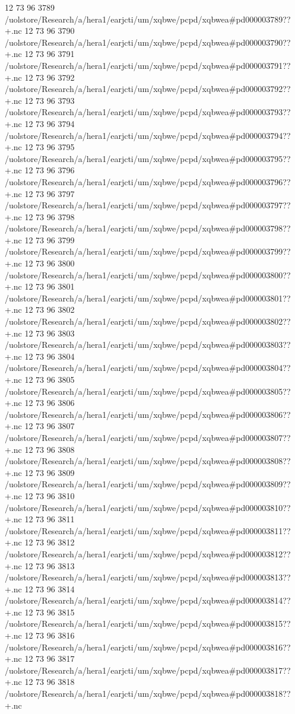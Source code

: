 12 73 96
3789
/uolstore/Research/a/hera1/earjcti/um/xqbwe/pcpd/xqbwea#pd000003789??+.nc
12 73 96
3790
/uolstore/Research/a/hera1/earjcti/um/xqbwe/pcpd/xqbwea#pd000003790??+.nc
12 73 96
3791
/uolstore/Research/a/hera1/earjcti/um/xqbwe/pcpd/xqbwea#pd000003791??+.nc
12 73 96
3792
/uolstore/Research/a/hera1/earjcti/um/xqbwe/pcpd/xqbwea#pd000003792??+.nc
12 73 96
3793
/uolstore/Research/a/hera1/earjcti/um/xqbwe/pcpd/xqbwea#pd000003793??+.nc
12 73 96
3794
/uolstore/Research/a/hera1/earjcti/um/xqbwe/pcpd/xqbwea#pd000003794??+.nc
12 73 96
3795
/uolstore/Research/a/hera1/earjcti/um/xqbwe/pcpd/xqbwea#pd000003795??+.nc
12 73 96
3796
/uolstore/Research/a/hera1/earjcti/um/xqbwe/pcpd/xqbwea#pd000003796??+.nc
12 73 96
3797
/uolstore/Research/a/hera1/earjcti/um/xqbwe/pcpd/xqbwea#pd000003797??+.nc
12 73 96
3798
/uolstore/Research/a/hera1/earjcti/um/xqbwe/pcpd/xqbwea#pd000003798??+.nc
12 73 96
3799
/uolstore/Research/a/hera1/earjcti/um/xqbwe/pcpd/xqbwea#pd000003799??+.nc
12 73 96
3800
/uolstore/Research/a/hera1/earjcti/um/xqbwe/pcpd/xqbwea#pd000003800??+.nc
12 73 96
3801
/uolstore/Research/a/hera1/earjcti/um/xqbwe/pcpd/xqbwea#pd000003801??+.nc
12 73 96
3802
/uolstore/Research/a/hera1/earjcti/um/xqbwe/pcpd/xqbwea#pd000003802??+.nc
12 73 96
3803
/uolstore/Research/a/hera1/earjcti/um/xqbwe/pcpd/xqbwea#pd000003803??+.nc
12 73 96
3804
/uolstore/Research/a/hera1/earjcti/um/xqbwe/pcpd/xqbwea#pd000003804??+.nc
12 73 96
3805
/uolstore/Research/a/hera1/earjcti/um/xqbwe/pcpd/xqbwea#pd000003805??+.nc
12 73 96
3806
/uolstore/Research/a/hera1/earjcti/um/xqbwe/pcpd/xqbwea#pd000003806??+.nc
12 73 96
3807
/uolstore/Research/a/hera1/earjcti/um/xqbwe/pcpd/xqbwea#pd000003807??+.nc
12 73 96
3808
/uolstore/Research/a/hera1/earjcti/um/xqbwe/pcpd/xqbwea#pd000003808??+.nc
12 73 96
3809
/uolstore/Research/a/hera1/earjcti/um/xqbwe/pcpd/xqbwea#pd000003809??+.nc
12 73 96
3810
/uolstore/Research/a/hera1/earjcti/um/xqbwe/pcpd/xqbwea#pd000003810??+.nc
12 73 96
3811
/uolstore/Research/a/hera1/earjcti/um/xqbwe/pcpd/xqbwea#pd000003811??+.nc
12 73 96
3812
/uolstore/Research/a/hera1/earjcti/um/xqbwe/pcpd/xqbwea#pd000003812??+.nc
12 73 96
3813
/uolstore/Research/a/hera1/earjcti/um/xqbwe/pcpd/xqbwea#pd000003813??+.nc
12 73 96
3814
/uolstore/Research/a/hera1/earjcti/um/xqbwe/pcpd/xqbwea#pd000003814??+.nc
12 73 96
3815
/uolstore/Research/a/hera1/earjcti/um/xqbwe/pcpd/xqbwea#pd000003815??+.nc
12 73 96
3816
/uolstore/Research/a/hera1/earjcti/um/xqbwe/pcpd/xqbwea#pd000003816??+.nc
12 73 96
3817
/uolstore/Research/a/hera1/earjcti/um/xqbwe/pcpd/xqbwea#pd000003817??+.nc
12 73 96
3818
/uolstore/Research/a/hera1/earjcti/um/xqbwe/pcpd/xqbwea#pd000003818??+.nc
